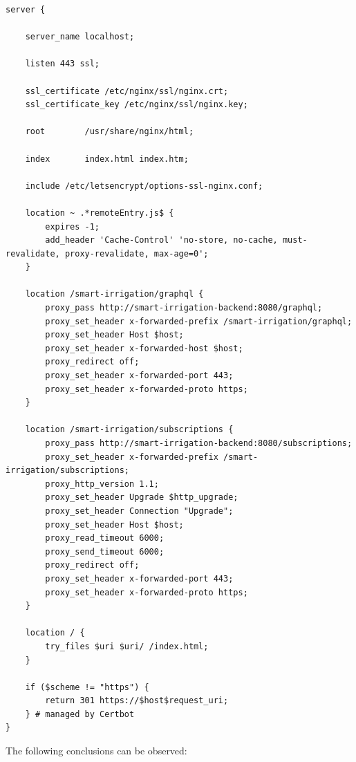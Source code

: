 \begin{lstlisting}[caption=Configuration File for Production Environment, label={code:implementation:description:nginx:irrig}]
server {

    server_name localhost;

    listen 443 ssl;

    ssl_certificate /etc/nginx/ssl/nginx.crt;
    ssl_certificate_key /etc/nginx/ssl/nginx.key;

    root        /usr/share/nginx/html;

    index       index.html index.htm;

    include /etc/letsencrypt/options-ssl-nginx.conf;

    location ~ .*remoteEntry.js$ {
        expires -1;
        add_header 'Cache-Control' 'no-store, no-cache, must-revalidate, proxy-revalidate, max-age=0';
    }

    location /smart-irrigation/graphql {
        proxy_pass http://smart-irrigation-backend:8080/graphql;
        proxy_set_header x-forwarded-prefix /smart-irrigation/graphql;
        proxy_set_header Host $host;
        proxy_set_header x-forwarded-host $host;
        proxy_redirect off;
        proxy_set_header x-forwarded-port 443;
        proxy_set_header x-forwarded-proto https;
    }

    location /smart-irrigation/subscriptions {
        proxy_pass http://smart-irrigation-backend:8080/subscriptions;
        proxy_set_header x-forwarded-prefix /smart-irrigation/subscriptions;
        proxy_http_version 1.1;
        proxy_set_header Upgrade $http_upgrade;
        proxy_set_header Connection "Upgrade";
        proxy_set_header Host $host;
        proxy_read_timeout 6000;
        proxy_send_timeout 6000;
        proxy_redirect off;
        proxy_set_header x-forwarded-port 443;
        proxy_set_header x-forwarded-proto https;
    }

    location / {
        try_files $uri $uri/ /index.html;
    }

    if ($scheme != "https") {
        return 301 https://$host$request_uri;
    } # managed by Certbot
}
\end{lstlisting}

The following conclusions can be observed:

